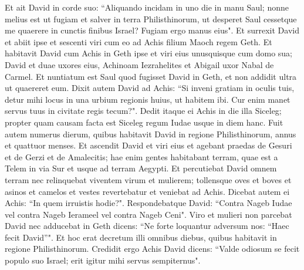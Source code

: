\begin{biblechapter}  
\verse Et ait David in corde suo: “Aliquando incidam in uno die in manu Saul; nonne melius est ut fugiam et salver in terra Philisthinorum, ut desperet Saul cessetque me quaerere in cunctis finibus Israel? Fugiam ergo manus eius". 
\verse Et surrexit David et abiit ipse et sescenti viri cum eo ad Achis filium Maoch regem Geth. 
\verse Et habitavit David cum Achis in Geth ipse et viri eius unusquisque cum domo sua; David et duae uxores eius, Achinoam Iezrahelites et Abigail uxor Nabal de Carmel. 
\verse Et nuntiatum est Saul quod fugisset David in Geth, et non addidit ultra ut quaereret eum. 
\verse Dixit autem David ad Achis: “Si inveni gratiam in oculis tuis, detur mihi locus in una urbium regionis huius, ut habitem ibi. Cur enim manet servus tuus in civitate regis tecum?". 
\verse Dedit itaque ei Achis in die illa Siceleg; propter quam causam facta est Siceleg regum Iudae usque in diem hanc. 
\verse Fuit autem numerus dierum, quibus habitavit David in regione Philisthinorum, annus et quattuor menses. 
\verse Et ascendit David et viri eius et agebant praedas de Gesuri et de Gerzi et de Amalecitis; hae enim gentes habitabant terram, quae est a Telem in via Sur et usque ad terram Aegypti. 
\verse Et percutiebat David omnem terram nec relinquebat viventem virum et mulierem; tollensque oves et boves et asinos et camelos et vestes revertebatur et veniebat ad Achis. 
\verse Dicebat autem ei Achis: “In quem irruistis hodie?". Respondebatque David: “Contra Nageb Iudae vel contra Nageb Ierameel vel contra Nageb Ceni". 
\verse Viro et mulieri non parcebat David nec adducebat in Geth dicens: “Ne forte loquantur adversum nos: “Haec fecit David”". Et hoc erat decretum illi omnibus diebus, quibus habitavit in regione Philisthinorum. 
\verse Credidit ergo Achis David dicens: “Valde odiosum se fecit populo suo Israel; erit igitur mihi servus sempiternus". 
\end{biblechapter}

